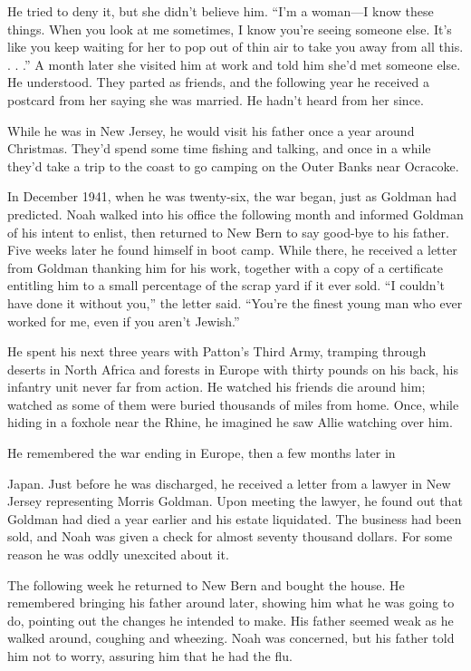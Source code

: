 \documentclass[10pt, twoside, openright]{book}
\begin{document}
He tried to deny it, but she didn't believe him. ``I'm a woman---I know
these things. When you look at me sometimes, I know you're seeing
someone else. It's like you keep waiting for her to pop out of thin air
to take you away from all this. . . .'' A month later she visited him at
work and told him she'd met someone else. He understood. They parted as
friends, and the following year he received a postcard from her saying
she was married. He hadn't heard from her since.

While he was in New Jersey, he would visit his father once a year around
Christmas. They'd spend some time fishing and talking, and once in a
while they'd take a trip to the coast to go camping on the Outer Banks
near Ocracoke.

In December 1941, when he was twenty-six, the war began, just as Goldman
had predicted. Noah walked into his office the following month and
informed Goldman of his intent to enlist, then returned to New Bern to
say good-bye to his father. Five weeks later he found himself in boot
camp. While there, he received a letter from Goldman thanking him for
his work, together with a copy of a certificate entitling him to a small
percentage of the scrap yard if it ever sold. ``I couldn't have done it
without you,'' the letter said. ``You're the finest young man who ever
worked for me, even if you aren't Jewish.''

He spent his next three years with Patton's Third Army, tramping through
deserts in North Africa and forests in Europe with thirty pounds on his
back, his infantry unit never far from action. He watched his friends
die around him; watched as some of them were buried thousands of miles
from home. Once, while hiding in a foxhole near the Rhine, he imagined
he saw Allie watching over him.


He remembered the war ending in Europe, then a few months later in


Japan. Just before he was discharged, he received a letter from a lawyer
in New Jersey representing Morris Goldman. Upon meeting the lawyer, he
found out that Goldman had died a year earlier and his estate
liquidated. The business had been sold, and Noah was given a check for
almost seventy thousand dollars. For some reason he was oddly unexcited
about it.

The following week he returned to New Bern and bought the house. He
remembered bringing his father around later, showing him what he was
going to do, pointing out the changes he intended to make. His father
seemed weak as he walked around, coughing and wheezing. Noah was
concerned, but his father told him not to worry, assuring him that he
had the flu.
\end{document}
